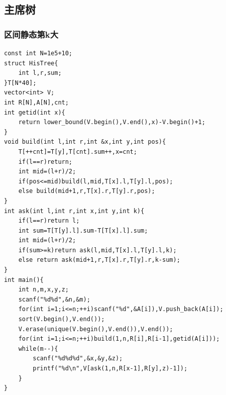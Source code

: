 \documentclass[twoside]{article}
\begin{document}
\subsection{主席树}
\subsubsection{区间静态第k大}
\begin{lstlisting}
const int N=1e5+10;
struct HisTree{
    int l,r,sum;
}T[N*40];
vector<int> V;
int R[N],A[N],cnt;
int getid(int x){
    return lower_bound(V.begin(),V.end(),x)-V.begin()+1;
}
void build(int l,int r,int &x,int y,int pos){
    T[++cnt]=T[y],T[cnt].sum++,x=cnt;
    if(l==r)return;
    int mid=(l+r)/2;
    if(pos<=mid)build(l,mid,T[x].l,T[y].l,pos);
    else build(mid+1,r,T[x].r,T[y].r,pos);
}
int ask(int l,int r,int x,int y,int k){
    if(l==r)return l;
    int sum=T[T[y].l].sum-T[T[x].l].sum;
    int mid=(l+r)/2;
    if(sum>=k)return ask(l,mid,T[x].l,T[y].l,k);
    else return ask(mid+1,r,T[x].r,T[y].r,k-sum);
}
int main(){
    int n,m,x,y,z;
    scanf("%d%d",&n,&m);
    for(int i=1;i<=n;++i)scanf("%d",&A[i]),V.push_back(A[i]);
    sort(V.begin(),V.end());
    V.erase(unique(V.begin(),V.end()),V.end());
    for(int i=1;i<=n;++i)build(1,n,R[i],R[i-1],getid(A[i]));
    while(m--){
        scanf("%d%d%d",&x,&y,&z);
        printf("%d\n",V[ask(1,n,R[x-1],R[y],z)-1]);
    }
}\end{lstlisting}
\end{document}
